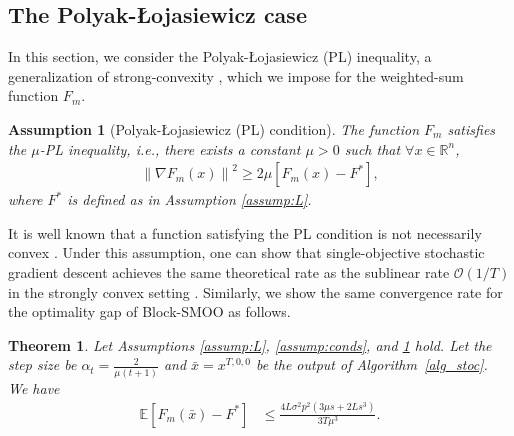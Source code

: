 \documentclass[11pt,a4paper]{article}
\numberwithin{equation}{section}%
\newtheorem{theorem}{Theorem}[section]
\newtheorem{assumption}{Assumption}[section]
\renewcommand{\(}{\left (}
\renewcommand{\)}{\right )}
\newcommand{\Lphif}{L}
\newcommand{\Fm}{F_m}
\begin{document}

\subsection{The Polyak-Łojasiewicz case}
In this section, we consider the Polyak-Łojasiewicz (PL) inequality, a generalization of strong-convexity \citep{Polyak1964,polyak_condition}, which we impose for the weighted-sum function $F_m$. 
\begin{assumption}[Polyak-Łojasiewicz (PL) condition]\label{assump:PL}
The function $\Fm$ satisfies the  $\mu$-PL inequality, i.e., there exists a constant $\mu > 0$ such that 
$\forall x \in \mathbb{R}^n$,
\begin{align*}
    \left\| \nabla \Fm(x)  \right\|^2 \geq 2\mu [\Fm(x) - F^*], 
\end{align*}
where $F^*$ is defined as in Assumption \ref{assump:L}.
\end{assumption}

It is well known that a function satisfying the PL condition is not necessarily convex \citep{polyak_condition}. Under this assumption, one can show that single-objective stochastic gradient descent achieves the same theoretical rate as the sublinear rate $\mathcal{O}(1/T)$ in the strongly convex setting \citep{pmlr-v54-de17a,gower2021sgd}. Similarly, we show the same convergence rate for the optimality gap of Block-SMOO as follows. 
\begin{theorem}
\label{thm:stronglyconvex}
Let Assumptions \ref{assump:L}, \ref{assump:conds}, and \ref{assump:PL} hold.
Let the step size be $\alpha_t = \frac{2}{\mu (t+1)}$ and $\bar{x} = x^{T,0,0}$ be the output of Algorithm~\ref{alg_stoc}.
We have
\begin{align*}
\mathbb{E} [\Fm(\bar{x})- F^*] %
&\leq  \frac{4\Lphif \sigma^2 p^2 (3\mu s + 2\Lphif  s^3)}{3T\mu^3}.
\end{align*}

\end{theorem}
\end{document}

